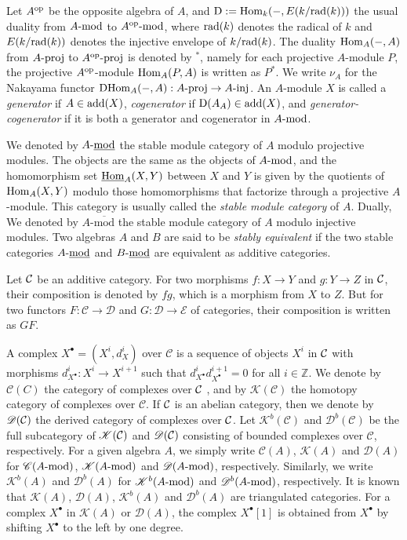 \documentclass[12pt]{article}
\numberwithin{equation}{section}
\theoremstyle{definition}
\newcommand{\add}{{\rm add}}
\newcommand{\DD}{{\rm D}}
\newcommand{\rad}{{\rm rad}}
\newcommand{\cpx}[1]{#1^{\bullet}}
\newcommand{\D}[1]{{\mathscr D}(#1)}
\newcommand{\Db}[1]{{\mathscr D}^b(#1)}
\newcommand{\C}[1]{{\mathscr C}(#1)}
\newcommand{\K}[1]{{\mathscr K}(#1)}
\newcommand{\Kb}[1]{{\mathscr K}^b(#1)}
\newcommand{\modcat}{\ensuremath{\mbox{{\rm -mod}}}}
\newcommand{\stmodcat}[1]{#1\mbox{{\rm -{\underline{mod}}}}}
\newcommand{\pmodcat}[1]{#1\mbox{{\rm -proj}}}
\newcommand{\imodcat}[1]{#1\mbox{{\rm -inj}}}
\newcommand{\opp}{^{\rm op}}
\newcommand{\Hom}{{\rm Hom}}
\newcommand{\ra}{\rightarrow}
\begin{document}
Let $A^{\rm {op}}$ be the opposite algebra of $A$, and $\DD:=\Hom_k(-,E(k/\rad(k)))$ the usual duality from $A\modcat$ to $A^{\rm {op}}\modcat$, where $\rad(k)$ denotes the radical of $k$ and $E(k/\rad(k))$ denotes the injective envelope of $k/\rad(k)$. The duality $\Hom_A(-, A)$ from $\pmodcat{A}$ to $\pmodcat{A\opp}$ is denoted by $^*$, namely for each projective $A$-module $P$, the projective $A\opp$-module $\Hom_A(P, A)$ is written as $P^*$. We write $\nu_A$ for the Nakayama functor $\DD\Hom_A(-,A): \pmodcat{A}\ra \imodcat{A}$. An $A$-module $X$ is called a \emph{generator} if $A\in\add(X)$, \emph{cogenerator} if $\DD(A_A)\in\add(X)$, and \emph{generator-cogenerator} if it is both a generator and cogenerator in $A\modcat$.

We denoted by $\stmodcat{A}$ the stable module category of $A$ modulo projective modules. The objects are the same as the objects of $A\modcat$, and the homomorphism set $\underline{\Hom}_A(X,Y)$ between $X$ and $Y$ is given by the quotients of $\Hom_A(X,Y)$  modulo those homomorphisms that factorize through a projective $A$-module. This category is usually called the \emph{stable module category} of $A$. Dually, We denoted by  $A\mbox{-}\overline{\mbox{mod}}$ the stable module category of $A$ modulo injective modules.
Two algebras $A$ and $B$ are said to be \emph{stably equivalent} if the two stable categories $A\stmodcat$ and $B\stmodcat$ are equivalent as additive categories.

\medskip
Let $\cal C$ be an additive category. For two morphisms $f:X\rightarrow Y$ and $g:Y\rightarrow Z$ in $\cal C$, their composition is denoted by $fg$, which is a morphism from $X$ to $Z$. But for two functors $F:\mathcal{C}\ra \mathcal{D}$ and $G:\mathcal{D}\ra\mathcal{E}$ of categories, their composition is written as $GF$.

A complex $\cpx{X}=(X^i, d_X^i)$ over $\mathcal{C}$ is a sequence of objects $X^i$ in
$\cal C$ with morphisms $d_{\cpx{X}}^{i}:X^i\ra X^{i+1}$ such that $d_{\cpx{X}}^{i}d_{\cpx{X}}^{i+1}=0$ for all $i \in {\mathbb Z}$. We denote by $\C{C}$  the category of complexes over $\cal C$ , and by $\K{\mathcal C}$ the homotopy category of complexes over $\mathcal{C}$. If $\cal C$ is an abelian category, then we denote by $\D{\cal C}$ the derived category of complexes over $\cal C$. Let $\Kb{\mathcal C}$
and $\Db{\mathcal C}$ be the full subcategory of $\K{\cal C}$ and $\D{\cal C}$ consisting of
bounded complexes over $\mathcal{C}$, respectively. For a given algebra $A$, we simply write $\C{A}$, $\K{A}$ and $\D{A}$ for $\C{A\modcat}$, $\K{A\modcat}$ and $\D{A\modcat}$, respectively. Similarly, we write $\Kb{A}$ and $\Db{A}$ for $\Kb{A\modcat}$ and $\Db{A\modcat}$, respectively.
It is known that $\K{A}$, $\D{A}$, $\Kb{A}$ and $\Db{A}$ are triangulated categories. For a complex $\cpx{X}$ in $\K{A}$ or $\D{A}$, the complex $\cpx{X}[1]$ is obtained from $\cpx{X}$ by shifting $\cpx{X}$ to the left by one degree.
\end{document}
